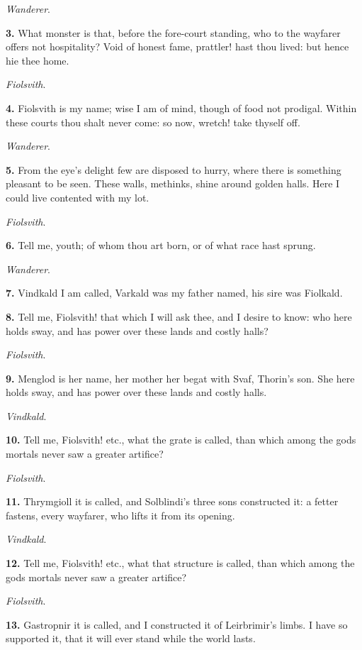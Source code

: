 \emph{Wanderer}.

\textbf{3.} What monster is that, before the fore-court standing, who to the
wayfarer offers not hospitality? Void of honest fame, prattler! hast
thou lived: but hence hie thee home.

\emph{Fiolsvith}.

\textbf{4.} Fiolsvith is my name; wise I am of mind, though of food not
prodigal. Within these courts thou shalt never come: so now, wretch!
take thyself off.

\emph{Wanderer}.

\textbf{5.} From the eye's delight few are disposed to hurry, where there is
something pleasant to be seen. These walls, methinks, shine around
golden halls. Here I could live contented with my lot.

\emph{Fiolsvith}.

\textbf{6.} Tell me, youth; of whom thou art born, or of what race hast
sprung.

\emph{Wanderer}.

\textbf{7.} Vindkald I am called, Varkald was my father named, his sire was
Fiolkald.

\textbf{8.} Tell me, Fiolsvith! that which I will ask thee, and I desire to
know: who here holds sway, and has power over these lands and costly
halls?

\emph{Fiolsvith}.

\textbf{9.} Menglod is her name, her mother her begat with Svaf, Thorin's
son. She here holds sway, and has power over these lands and costly
halls.

\emph{Vindkald}.

\textbf{10.} Tell me, Fiolsvith! etc., what the grate is called, than which
among the gods mortals never saw a greater artifice?

\emph{Fiolsvith}.

\textbf{11.} Thrymgioll it is called, and Solblindi's three sons constructed
it: a fetter fastens, every wayfarer, who lifts it from its opening.

\emph{Vindkald}.

\textbf{12.} Tell me, Fiolsvith! etc., what that structure is called, than
which among the gods mortals never saw a greater artifice?

\emph{Fiolsvith}.

\textbf{13.} Gastropnir it is called, and I constructed it of Leirbrimir's
limbs. I have so supported it, that it will ever stand while the world
lasts.

